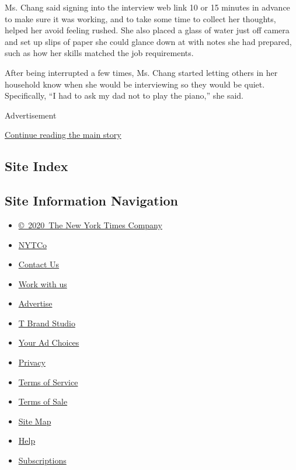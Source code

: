Ms. Chang said signing into the interview web link 10 or 15 minutes in
advance to make sure it was working, and to take some time to collect
her thoughts, helped her avoid feeling rushed. She also placed a glass
of water just off camera and set up slips of paper she could glance down
at with notes she had prepared, such as how her skills matched the job
requirements.

After being interrupted a few times, Ms. Chang started letting others in
her household know when she would be interviewing so they would be
quiet. Specifically, ``I had to ask my dad not to play the piano,'' she
said.

Advertisement

\protect\hyperlink{after-bottom}{Continue reading the main story}

\hypertarget{site-index}{%
\subsection{Site Index}\label{site-index}}

\hypertarget{site-information-navigation}{%
\subsection{Site Information
Navigation}\label{site-information-navigation}}

\begin{itemize}
\tightlist
\item
  \href{https://help.nytimes.com/hc/en-us/articles/115014792127-Copyright-notice}{©~2020~The
  New York Times Company}
\end{itemize}

\begin{itemize}
\tightlist
\item
  \href{https://www.nytco.com/}{NYTCo}
\item
  \href{https://help.nytimes.com/hc/en-us/articles/115015385887-Contact-Us}{Contact
  Us}
\item
  \href{https://www.nytco.com/careers/}{Work with us}
\item
  \href{https://nytmediakit.com/}{Advertise}
\item
  \href{http://www.tbrandstudio.com/}{T Brand Studio}
\item
  \href{https://www.nytimes.com/privacy/cookie-policy\#how-do-i-manage-trackers}{Your
  Ad Choices}
\item
  \href{https://www.nytimes.com/privacy}{Privacy}
\item
  \href{https://help.nytimes.com/hc/en-us/articles/115014893428-Terms-of-service}{Terms
  of Service}
\item
  \href{https://help.nytimes.com/hc/en-us/articles/115014893968-Terms-of-sale}{Terms
  of Sale}
\item
  \href{https://spiderbites.nytimes.com}{Site Map}
\item
  \href{https://help.nytimes.com/hc/en-us}{Help}
\item
  \href{https://www.nytimes.com/subscription?campaignId=37WXW}{Subscriptions}
\end{itemize}
